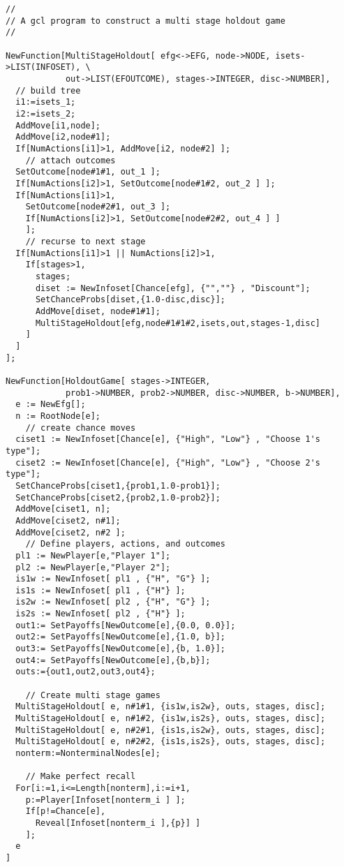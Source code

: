 {\scriptsize 
\begin{verbatim}
//
// A gcl program to construct a multi stage holdout game
//

NewFunction[MultiStageHoldout[ efg<->EFG, node->NODE, isets->LIST(INFOSET), \
            out->LIST(EFOUTCOME), stages->INTEGER, disc->NUMBER],
  // build tree
  i1:=isets_1;
  i2:=isets_2;
  AddMove[i1,node];
  AddMove[i2,node#1];
  If[NumActions[i1]>1, AddMove[i2, node#2] ];
    // attach outcomes
  SetOutcome[node#1#1, out_1 ]; 
  If[NumActions[i2]>1, SetOutcome[node#1#2, out_2 ] ];
  If[NumActions[i1]>1, 
    SetOutcome[node#2#1, out_3 ];
    If[NumActions[i2]>1, SetOutcome[node#2#2, out_4 ] ]
    ];
    // recurse to next stage
  If[NumActions[i1]>1 || NumActions[i2]>1,
    If[stages>1,
      stages;
      diset := NewInfoset[Chance[efg], {"",""} , "Discount"];
      SetChanceProbs[diset,{1.0-disc,disc}];
      AddMove[diset, node#1#1];
      MultiStageHoldout[efg,node#1#1#2,isets,out,stages-1,disc]
    ]
  ]
];

NewFunction[HoldoutGame[ stages->INTEGER,
            prob1->NUMBER, prob2->NUMBER, disc->NUMBER, b->NUMBER],
  e := NewEfg[];
  n := RootNode[e];
    // create chance moves
  ciset1 := NewInfoset[Chance[e], {"High", "Low"} , "Choose 1's type"];
  ciset2 := NewInfoset[Chance[e], {"High", "Low"} , "Choose 2's type"];
  SetChanceProbs[ciset1,{prob1,1.0-prob1}];
  SetChanceProbs[ciset2,{prob2,1.0-prob2}];
  AddMove[ciset1, n];
  AddMove[ciset2, n#1];
  AddMove[ciset2, n#2 ];
    // Define players, actions, and outcomes
  pl1 := NewPlayer[e,"Player 1"];
  pl2 := NewPlayer[e,"Player 2"];
  is1w := NewInfoset[ pl1 , {"H", "G"} ];
  is1s := NewInfoset[ pl1 , {"H"} ];
  is2w := NewInfoset[ pl2 , {"H", "G"} ];
  is2s := NewInfoset[ pl2 , {"H"} ];
  out1:= SetPayoffs[NewOutcome[e],{0.0, 0.0}];
  out2:= SetPayoffs[NewOutcome[e],{1.0, b}];
  out3:= SetPayoffs[NewOutcome[e],{b, 1.0}];
  out4:= SetPayoffs[NewOutcome[e],{b,b}];
  outs:={out1,out2,out3,out4};

    // Create multi stage games
  MultiStageHoldout[ e, n#1#1, {is1w,is2w}, outs, stages, disc];
  MultiStageHoldout[ e, n#1#2, {is1w,is2s}, outs, stages, disc];
  MultiStageHoldout[ e, n#2#1, {is1s,is2w}, outs, stages, disc];
  MultiStageHoldout[ e, n#2#2, {is1s,is2s}, outs, stages, disc];
  nonterm:=NonterminalNodes[e];

    // Make perfect recall 
  For[i:=1,i<=Length[nonterm],i:=i+1,
    p:=Player[Infoset[nonterm_i ] ];
    If[p!=Chance[e],
      Reveal[Infoset[nonterm_i ],{p}] ]
    ];	
  e
]
\end{verbatim}
}

